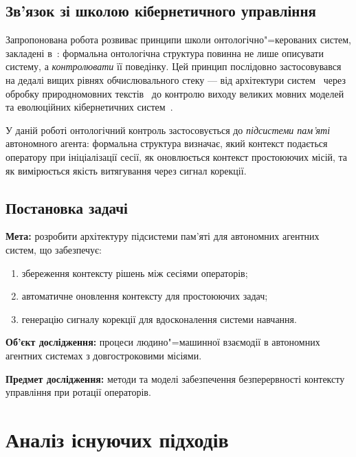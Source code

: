 \documentclass[11pt]{article}
\begin{document}
\subsection{Зв'язок зі школою кібернетичного управління}

Запропонована робота розвиває принципи школи онтологічно"=керованих систем, закладені в~\citep{palagin2006architecture}: формальна онтологічна структура повинна не лише описувати систему, а \emph{контролювати} її поведінку.
Цей принцип послідовно застосовувався на дедалі вищих рівнях обчислювального стеку --- від архітектури систем~\citep{palagin2006architecture} через обробку природномовних текстів~\citep{palagin2012knowledge, palagin2020distributional} до контролю виходу великих мовних моделей~\citep{palagin2023ontochatgpt, palagin2024neural} та еволюційних кібернетичних систем~\citep{palagin2025evolutionary}.

У даній роботі онтологічний контроль застосовується до \emph{підсистеми пам'яті} автономного агента: формальна структура визначає, який контекст подається оператору при ініціалізації сесії, як оновлюється контекст простоюючих місій, та як вимірюється якість витягування через сигнал корекції.

\subsection{Постановка задачі}

\textbf{Мета:} розробити архітектуру підсистеми пам'яті для автономних агентних систем, що забезпечує:
\begin{enumerate}[nosep]
  \item збереження контексту рішень між сесіями операторів;
  \item автоматичне оновлення контексту для простоюючих задач;
  \item генерацію сигналу корекції для вдосконалення системи навчання.
\end{enumerate}

\textbf{Об'єкт дослідження:} процеси людино"=машинної взаємодії в автономних агентних системах з довгостроковими місіями.

\textbf{Предмет дослідження:} методи та моделі забезпечення безперервності контексту управління при ротації операторів.


\section{Аналіз існуючих підходів}
\label{sec:related}
\end{document}
